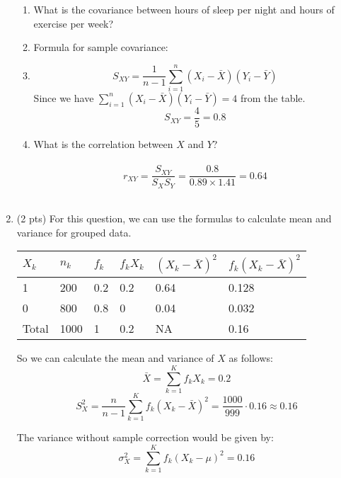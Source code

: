 \documentclass{./../../Latex/handout}
\begin{document}
\begin{enumerate}
\begin{enumerate}
\item What is the covariance between hours of sleep per night and hours of exercise per week? 
\item [] Formula for sample covariance:
\item[] $$ S_{XY} = \frac{1}{n-1}\sum_{i=1}^n (X_i-\bar{X})(Y_i-\bar{Y}) $$
Since we have $\sum_{i=1}^n (X_i-\bar{X})(Y_i-\bar{Y})=4$ from the table. $$ S_{XY} = \frac{4}{5} = 0.8$$
\item What is the correlation between $X$ and $Y$? \\~\\
 $$ r_{XY} = \frac{S_{XY}}{S_X S_Y} = \frac{0.8}{0.89 \times 1.41} = 0.64 $$ \\
\end{enumerate}

\item (2 pts) For this question, we can use the formulas to calculate mean and variance for grouped data.
\begin{center}
\begin{tabularx}{0.9\textwidth}{|@{}Y| @{}Y |@{}Y| @{}Y| @{}Y| @{}Y@{}|}
\hline
 $X_k$ & $n_k$ & $f_k$ & $f_k X_k$ & $(X_k-\bar{X})^2$ & $f_k (X_k-\bar{X})^2$ \\   & 200 & 0.2 & 0.2 & 0.64 & 0.128\\  & 800 & 0.8 & 0 &  0.04 & 0.032 \\ \hline
Total & 1000 & 1 & 0.2 & NA & 0.16 \\ 
\hline
\end{tabularx}	
\end{center}
So we can calculate the mean and variance of $X$ as follows:
$$\bar{X} = \sum_{k=1}^K f_k X_k = 0.2  $$
$$ S_X^2 = \frac{n}{n-1} \sum_{k=1}^K f_k (X_k-\bar{X})^2 = \frac{1000}{999}\cdot 0.16 \approx 0.16 $$ 

The variance without sample correction would be given by:
$$ \sigma_X^2 = \sum_{k=1}^K f_k (X_k-\mu)^2 =  0.16 $$ 

\end{enumerate}
\end{document}
